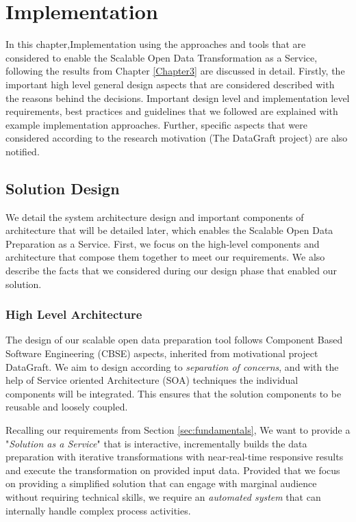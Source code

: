 
\chapter{Implementation} %
\label{Chapter4} %


In this chapter,Implementation using the approaches and tools that are considered to enable the Scalable Open Data Transformation as a Service, following the results from Chapter \ref{Chapter3} are discussed in detail. Firstly, the important high level general design aspects that are considered described with the reasons behind the decisions. Important design level and implementation level requirements, best practices and guidelines that we followed are explained with example implementation approaches.  Further, specific aspects that were considered according to the research motivation (The DataGraft project) are also notified. 
\section{Solution Design}
We detail the system architecture design and important components of architecture that will be detailed later, which enables the Scalable Open Data Preparation as a Service. First, we focus on the high-level components and architecture that compose them together to meet our requirements. We also describe the facts that we considered during our design phase that enabled our solution. 
\subsection{High Level Architecture}
The design of our scalable open data preparation tool follows Component Based Software Engineering (CBSE) \cite{CBSE} aspects, inherited from motivational project DataGraft. We aim to design according to \textit{separation of concerns}, and with the help of Service oriented Architecture (SOA) techniques the individual components will be integrated. This ensures that the solution components to be reusable and loosely coupled. 

Recalling our requirements from Section \ref{sec:fundamentals}, We want to provide a "\textit{Solution as a Service}" that is interactive, incrementally builds the data preparation with iterative transformations with near-real-time responsive results and execute the transformation on provided input data. Provided that we focus on providing a simplified solution that can engage with marginal audience without requiring technical skills, we require an \textit{automated system} that can  internally handle complex process activities. 

